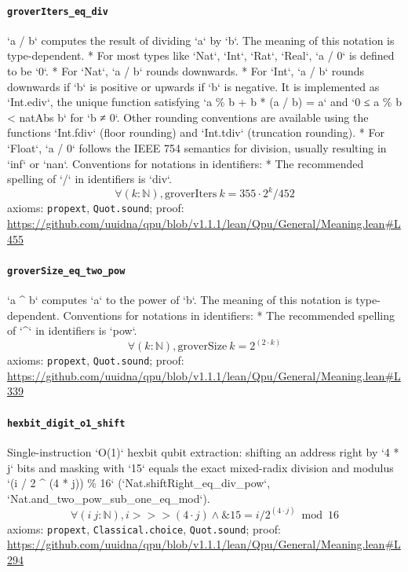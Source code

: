 \documentclass[11pt]{article}
\begin{document}
\paragraph{\texttt{groverIters\_eq\_div}}
`a / b` computes the result of dividing `a` by `b`. The meaning of this notation is type-dependent. * For most types like `Nat`, `Int`, `Rat`, `Real`, `a / 0` is defined to be `0`. * For `Nat`, `a / b` rounds downwards. * For `Int`, `a / b` rounds downwards if `b` is positive or upwards if `b` is negative.   It is implemented as `Int.ediv`, the unique function satisfying   `a \% b + b * (a / b) = a` and `0 ≤ a \% b < natAbs b` for `b ≠ 0`.   Other rounding conventions are available using the functions   `Int.fdiv` (floor rounding) and `Int.tdiv` (truncation rounding). * For `Float`, `a / 0` follows the IEEE 754 semantics for division,   usually resulting in `inf` or `nan`.   Conventions for notations in identifiers:   * The recommended spelling of `/` in identifiers is `div`.
\[ \forall (k : \mathbb{N}), \mathrm{groverIters}\ k = 355 \cdot 2 ^{k} / 452 \]
\noindent axioms: \texttt{propext}, \texttt{Quot.sound}; proof: \url{https://github.com/uuidna/qpu/blob/v1.1.1/lean/Qpu/General/Meaning.lean\#L455}

\paragraph{\texttt{groverSize\_eq\_two\_pow}}
`a \^{} b` computes `a` to the power of `b`. The meaning of this notation is type-dependent.   Conventions for notations in identifiers:   * The recommended spelling of `\^{}` in identifiers is `pow`.
\[ \forall (k : \mathbb{N}), \mathrm{groverSize}\ k = 2 ^{(2 \cdot k)} \]
\noindent axioms: \texttt{propext}, \texttt{Quot.sound}; proof: \url{https://github.com/uuidna/qpu/blob/v1.1.1/lean/Qpu/General/Meaning.lean\#L339}

\paragraph{\texttt{hexbit\_digit\_o1\_shift}}
Single-instruction `O(1)` hexbit qubit extraction: shifting an address right by `4 * j` bits and masking with `15` equals the exact mixed-radix division and modulus `(i / 2 \^{} (4 * j)) \% 16` (`Nat.shiftRight\_eq\_div\_pow`, `Nat.and\_two\_pow\_sub\_one\_eq\_mod`).
\[ \forall (i\ j : \mathbb{N}), i >>> (4 \cdot j) \land \& 15 = i / 2 ^{(4 \cdot j)} \bmod 16 \]
\noindent axioms: \texttt{propext}, \texttt{Classical.choice}, \texttt{Quot.sound}; proof: \url{https://github.com/uuidna/qpu/blob/v1.1.1/lean/Qpu/General/Meaning.lean\#L294}
\end{document}
